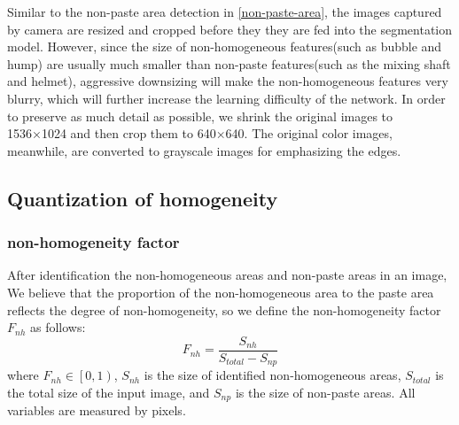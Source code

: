 \documentclass[pdflatex,sn-mathphys]{sn-jnl}%
\theoremstyle{thmstyleone}%
\theoremstyle{thmstyletwo}%
\theoremstyle{thmstylethree}%
\begin{document}
Similar to the non-paste area detection in \ref{non-paste-area},
the images captured by camera are resized and cropped before they they are fed into the segmentation model. 
However, since the size of non-homogeneous features(such as bubble and hump) are usually much smaller than non-paste features(such as the mixing shaft and helmet), aggressive downsizing will make the non-homogeneous features very blurry, which will further increase the learning difficulty of the network.
In order to preserve as much detail as possible, we shrink the original images to 1536×1024 and then crop them to 640×640.
The original color images, meanwhile, are converted to grayscale images for emphasizing the edges.


\subsection{Quantization of homogeneity}\label{sec2.3}

\subsubsection{non-homogeneity factor}\label{2.3.1}
After identification the non-homogeneous areas and non-paste areas in an image, We believe that the proportion of the non-homogeneous area to the paste area reflects the degree of non-homogeneity, so we define the non-homogeneity factor $F_{nh}$ as follows:
\begin{equation}
\label{equ:prop_p}
F_{nh} = \frac{S_{nh}}{{S_{total} - S_{np}}}
\end{equation}
where $F_{nh}\in\left[0,1 \right)$, $S_{nh}$ is the size of identified non-homogeneous areas, $S_{total}$ is the total size of the input image, and $S_{np}$ is the size of non-paste areas.
All variables are measured by pixels.          
\end{document}
